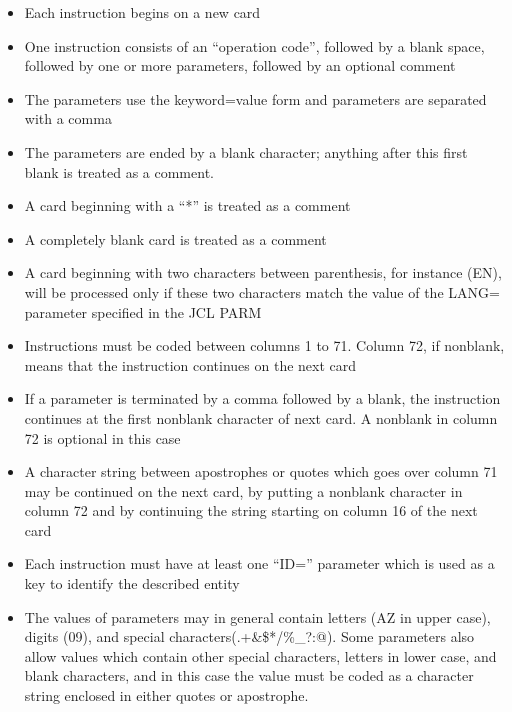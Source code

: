 \documentclass[letterpaper,10pt,english]{sphinxmanual}
\begin{document}
\begin{itemize}
\item {} 
\sphinxAtStartPar
Each instruction begins on a new card

\item {} 
\sphinxAtStartPar
One instruction consists of an “operation code”, followed by a blank space, followed by one or more parameters, followed by an optional comment

\item {} 
\sphinxAtStartPar
The parameters use the keyword=value form and parameters are separated with a comma

\item {} 
\sphinxAtStartPar
The parameters are ended by a blank character; anything after this first blank is treated as a comment.

\item {} 
\sphinxAtStartPar
A card beginning with a “*” is treated as a comment

\item {} 
\sphinxAtStartPar
A completely blank card is treated as a comment

\item {} 
\sphinxAtStartPar
A card beginning with two characters between parenthesis, for instance (EN), will be processed only if these two characters match the value of the LANG= parameter specified in the JCL PARM

\item {} 
\sphinxAtStartPar
Instructions must be coded between columns 1 to 71. Column 72, if non\sphinxhyphen{}blank, means that the instruction continues on the next card

\item {} 
\sphinxAtStartPar
If a parameter is terminated by a comma followed by a blank, the instruction continues at the first non\sphinxhyphen{}blank character of next card. A non\sphinxhyphen{}blank in column 72 is optional in this case

\item {} 
\sphinxAtStartPar
A character string between apostrophes or quotes which goes over column 71 may be continued on the next card, by putting a non\sphinxhyphen{}blank character in column 72 and by continuing the string starting on column 16 of the next card

\item {} 
\sphinxAtStartPar
Each instruction must have at least one “ID=” parameter which is used as a key to identify the described entity

\item {} 
\sphinxAtStartPar
The values of parameters may in general contain letters (A\sphinxhyphen{}Z in upper case), digits (0\sphinxhyphen{}9), and special characters(.+\&\$*\sphinxhyphen{}/\%\_?:@). Some parameters also allow values which contain other special characters, letters in lower case, and blank characters, and in this case the value must be coded as a character string enclosed in either quotes or apostrophe.

\end{itemize}
\end{document}
